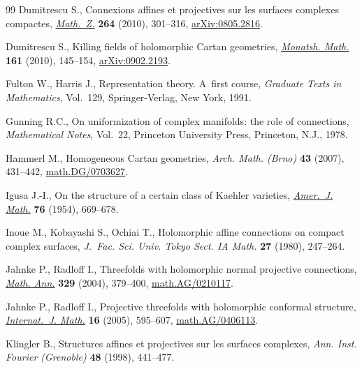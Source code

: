 \documentclass[pdftex]{sigma}
\begin{document}
\begin{thebibliography}{99}
Dumitrescu S.,
Connexions af\/f\/ines et projectives sur les surfaces complexes   compactes,
\href{http://dx.doi.org/10.1007/s00209-008-0465-8}{{\em Math.~Z.}} {\bf 264} (2010), 301--316,
\href{http://arxiv.org/abs/0805.2816}{arXiv:0805.2816}.

Dumitrescu S.,
Killing f\/ields of holomorphic Cartan geometries,
\href{http://dx.doi.org/10.1007/s00605-009-0135-x}{{\em Monatsh. Math.}} {\bf 161} (2010), 145--154,
\href{http://arxiv.org/abs/0902.2193}{arXiv:0902.2193}.

 Fulton W.,  Harris J.,
  Representation theory. A~f\/irst course,
  {\em Graduate Texts in   Mathematics}, Vol.~129,
 Springer-Verlag, New York, 1991.

Gunning R.C.,
On uniformization of complex manifolds: the role of connections,
{\em Mathematical Notes}, Vol.~22,
Princeton University Press, Princeton, N.J., 1978.

Hammerl M.,
Homogeneous Cartan geometries,
{\em Arch. Math. (Brno)} {\bf 43} (2007), 431--442,
\href{http://arxiv.org/abs/math.DG/0703627}{math.DG/0703627}.

 Igusa J.-I.,
 On the structure of a certain class of Kaehler varieties,
\href{http://dx.doi.org/10.2307/2372709}{{\em Amer.~J. Math.}}  {\bf 76} (1954), 669--678.

  Inoue M.,  Kobayashi S.,  Ochiai T.,
 Holomorphic af\/f\/ine connections on compact complex surfaces,
 {\em J.~Fac. Sci. Univ. Tokyo Sect. IA Math.} {\bf 27} (1980), 247--264.

 Jahnke P., Radlof\/f I.,
 Threefolds with holomorphic normal projective connections,
\href{http://dx.doi.org/10.1007/s00208-004-0406-8}{{\em Math. Ann.}} {\bf 329} (2004), 379--400,
\href{http://arxiv.org/abs/math.AG/0210117}{math.AG/0210117}.

 Jahnke P., Radlof\/f I.,
Projective threefolds with holomorphic conformal structure,
\href{http://dx.doi.org/10.1142/S0129167X05003028}{{\it Internat.~J. Math.}} {\bf 16} (2005), 595--607,
\href{http://arxiv.org/abs/math.AG/0406113}{math.AG/0406113}.

Klingler B.,
Structures af\/f\/ines et projectives sur les surfaces complexes,
{\em Ann. Inst. Fourier (Grenoble)} {\bf 48} (1998), 441--477.


\end{thebibliography}
\end{document}
